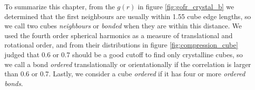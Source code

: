 \documentclass[thesis]{subfiles}
\begin{document}
To summarize this chapter, from the $g(r)$ in figure \ref{fig:gofr_crystal_b} we determined that the first neighbours are usually within 1.55 cube edge lengths, so we call two cubes \emph{neighbours} or \emph{bonded} when they are within this distance. We used the fourth order spherical harmonics as a measure of translational and rotational order, and from their distributions in figure \ref{fig:compression_cube} judged that 0.6 or 0.7 should be a good cutoff to find only crystalline cubes, so we call a bond \emph{ordered} translationally or orientationally if the correlation is larger than 0.6 or 0.7. Lastly, we consider a cube \emph{ordered} if it has four or more \emph{ordered bonds}. 


\printbibliography[%
]
\end{document}
